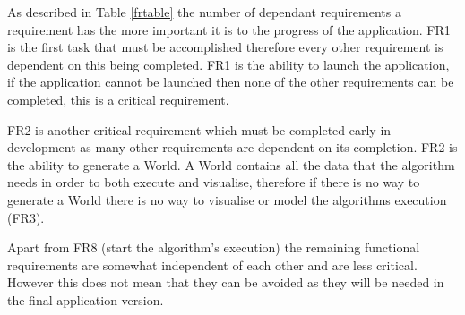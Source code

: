 \noindent
As described in Table \ref{frtable} the number of dependant requirements a requirement has the more important it is to the progress of the application. FR1 is the first task that must be accomplished therefore every other requirement is dependent on this being completed. FR1 is the ability to launch the application, if the application cannot be launched then none of the other requirements can be completed, this is a critical requirement.

FR2 is another critical requirement which must be completed early in development as many other requirements are dependent on its completion. FR2 is the ability to generate a World. A World contains all the data that the algorithm needs in order to both execute and visualise, therefore if there is no way to generate a World there is no way to visualise or model the algorithms execution (FR3).

Apart from FR8 (start the algorithm’s execution) the remaining functional requirements are somewhat independent of each other and are less critical. However this does not mean that they can be avoided as they will be needed in the final application version.
